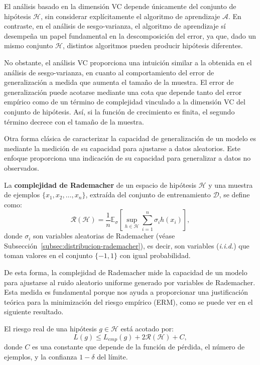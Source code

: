 \begin{observacion}
    El análisis basado en la dimensión VC depende únicamente del conjunto de hipótesis $\mathcal{H}$, sin considerar explícitamente el algoritmo de aprendizaje $\mathcal{A}$. En contraste, en el análisis de sesgo-varianza, el algoritmo de aprendizaje sí desempeña un papel fundamental en la descomposición del error, ya que, dado un mismo conjunto $\mathcal{H}$, distintos algoritmos pueden producir hipótesis diferentes.
\end{observacion}

No obstante, el análisis VC proporciona una intuición similar a la obtenida en el análisis de sesgo-varianza, en cuanto al comportamiento del error de generalización a medida que aumenta el tamaño de la muestra. El error de generalización puede acotarse mediante una cota que depende tanto del error empírico como de un término de complejidad vinculado a la dimensión VC del conjunto de hipótesis. Así, si la función de crecimiento es finita, el segundo término decrece con el tamaño de la muestra.

Otra forma clásica de caracterizar la capacidad de generalización de un modelo es mediante la medición de su capacidad para ajustarse a datos aleatorios. Este enfoque proporciona una indicación de su capacidad para generalizar a datos no observados.

\begin{definicion}
    La \textbf{complejidad de Rademacher} de un espacio de hipótesis $ \mathcal{H} $ y una muestra de ejemplos $\{ x_1, x_2, \dots, x_n \}$, extraída del conjunto de entrenamiento $ \mathcal{D} $, se define como:
    \[
        \mathcal{R}(\mathcal{H}) = \frac{1}{n} \mathbb{E}_{\sigma} \left[ \sup_{h \in \mathcal{H}} \sum_{i=1}^n \sigma_i h(x_i) \right],
    \]
    donde $ \sigma_i $ son variables aleatorias de Rademacher (véase Subsección~\ref{subsec:distribucion-rademacher}), es decir, son variables (\textit{i.i.d.}) que toman valores en el conjunto $ \{-1, 1\} $ con igual probabilidad.
\end{definicion}

De esta forma, la complejidad de Rademacher mide la capacidad de un modelo para ajustarse al ruido aleatorio uniforme generado por variables de Rademacher. Esta medida es fundamental porque nos ayuda a proporcionar una justificación teórica para la minimización del riesgo empírico (ERM), como se puede ver en el siguiente resultado.

\begin{teorema}
    El riesgo real de una hipótesis $ g \in \mathcal{H} $ está acotado por:
    \[
        L(g) \leq L_{emp}(g) + 2 \mathcal{R}(\mathcal{H}) + C,
    \]
    donde $ C $ es una constante que depende de la función de pérdida, el número de ejemplos, y la confianza $ 1 - \delta $ del límite.
\end{teorema}

